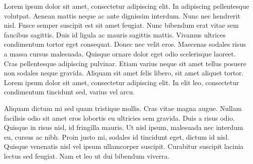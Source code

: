 Lorem ipsum dolor sit amet, consectetur adipiscing elit. In adipiscing pellentesque volutpat. Aenean mattis neque ac ante dignissim interdum. Nunc nec hendrerit nisl. Fusce semper suscipit est sit amet feugiat. Nunc bibendum erat vitae sem faucibus sagittis. Duis id ligula ac mauris sagittis mattis. Vivamus ultrices condimentum tortor eget consequat. Donec nec velit eros. Maecenas sodales risus a massa cursus malesuada. Quisque ornare dolor eget odio scelerisque laoreet. Cras pellentesque adipiscing pulvinar. Etiam varius neque sit amet tellus posuere non sodales neque gravida. Aliquam sit amet felis libero, sit amet aliquet tortor. Lorem ipsum dolor sit amet, consectetur adipiscing elit. In elit leo, consectetur condimentum tincidunt sed, varius vel arcu.

Aliquam dictum mi sed quam tristique mollis. Cras vitae magna augue. Nullam facilisis odio sit amet eros lobortis eu ultricies sem gravida. Duis a risus odio. Quisque in risus nisl, id fringilla mauris. Ut nisl ipsum, malesuada nec interdum eu, cursus ac nibh. Proin justo mi, sodales id tincidunt eget, dictum id nisl. Quisque venenatis nisl vel ipsum ullamcorper suscipit. Curabitur suscipit lacinia lectus sed feugiat. Nam et leo ut dui bibendum viverra.